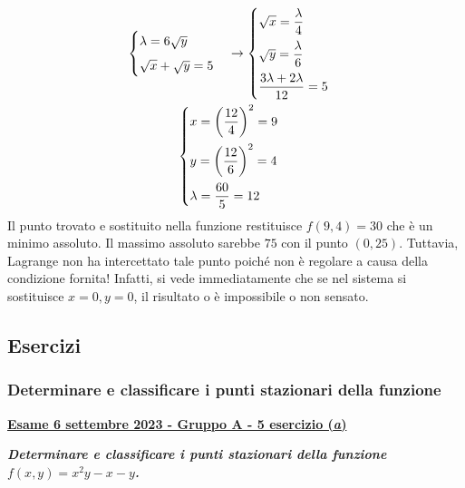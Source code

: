 \documentclass[a4paper]{article}
\newcommand{\definition}[1]{\textcolor{Red3}{\textbf{#1}}}
\newcommand{\example}[1]{\textcolor{Green4}{\textbf{#1}}}
\begin{document}
\begin{gather*}
\begin{cases}
			\lambda = 6\sqrt{y} \vspace{.5em} \\
			\sqrt{x}+\sqrt{y} = 5
		\end{cases}
		\rightarrow
		\begin{cases}
			\sqrt{x} = \dfrac{\lambda}{4} \vspace{.5em} \\
			\sqrt{y} = \dfrac{\lambda}{6} \vspace{.5em} \\
			\dfrac{3\lambda + 2\lambda}{12} = 5
		\end{cases}
		\\
		\begin{cases}
			x = \left(\dfrac{12}{4}\right)^{2} = 9 \vspace{.5em} \\
			y = \left(\dfrac{12}{6}\right)^{2} = 4 \vspace{.5em} \\
			\lambda = \dfrac{60}{5} = 12
		\end{cases}
	\end{gather*}
	Il punto trovato e sostituito nella funzione restituisce $f\left(9,4\right) = 30$ che è un minimo assoluto. Il massimo assoluto sarebbe $75$ con il punto $\left(0,25\right)$. Tuttavia, Lagrange non ha intercettato tale punto poiché non è regolare a causa della condizione fornita! Infatti, si vede immediatamente che se nel sistema si sostituisce $x=0,y=0$, il risultato o è impossibile o non sensato.\newpage

	\subsection{Esercizi}

	\subsubsection{Determinare e classificare i punti stazionari della funzione}

	\begin{flushleft}
		\label{exam: esame 06 settembre 2023 - Gruppo A - 5 esercizio (a)}
		\hypertarget{
			exam: esame 06 settembre 2023 - Gruppo A - 5 esercizio (a)
		}{
			\definition{\underline{Esame 6 settembre 2023 - Gruppo A - 5 esercizio (\emph{a})}}
		}
	\end{flushleft}
	\example{\emph{Determinare e classificare i punti stazionari della funzione $f\left(x,y\right) = x^{2}y - x -y$.}}\newline
\end{document}
